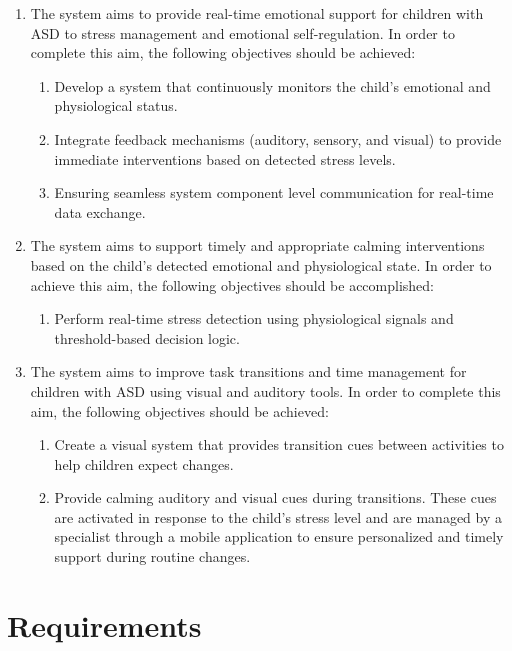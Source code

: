 \documentclass[a4paper,12pt]{report}
\begin{document}
\begin{enumerate}
    \item The system aims to provide real-time emotional support for children with ASD to stress management and emotional self-regulation. In order to complete this aim, the following objectives should be achieved:
    \begin{enumerate}[label=(\alph*)]
        \item Develop a system that continuously monitors the child's emotional and physiological status.
        \item Integrate feedback mechanisms (auditory, sensory, and visual) to provide immediate interventions based on detected stress levels.
        \item Ensuring seamless system component level communication for real-time data exchange.
    \end{enumerate}

    \item The system aims to support timely and appropriate calming interventions based on the child’s detected emotional and physiological state. In order to achieve this aim, the following objectives should be accomplished:
    \begin{enumerate}[label=(\alph*)]
        \item Perform real-time stress detection using physiological signals and threshold-based decision logic.
    \end{enumerate}

    \item The system aims to improve task transitions and time management for children with ASD using visual and auditory tools. In order to complete this aim, the following objectives should be achieved: 
    \begin{enumerate}[label=(\alph*)]
        \item Create a visual system that provides transition cues between activities to help children expect changes.
        \item Provide calming auditory and visual cues during transitions. These cues are activated in response to the child’s stress level and are managed by a specialist through a  mobile application to ensure personalized and timely support during routine changes.
    \end{enumerate}
\end{enumerate}

\section{Requirements}
\end{document}
